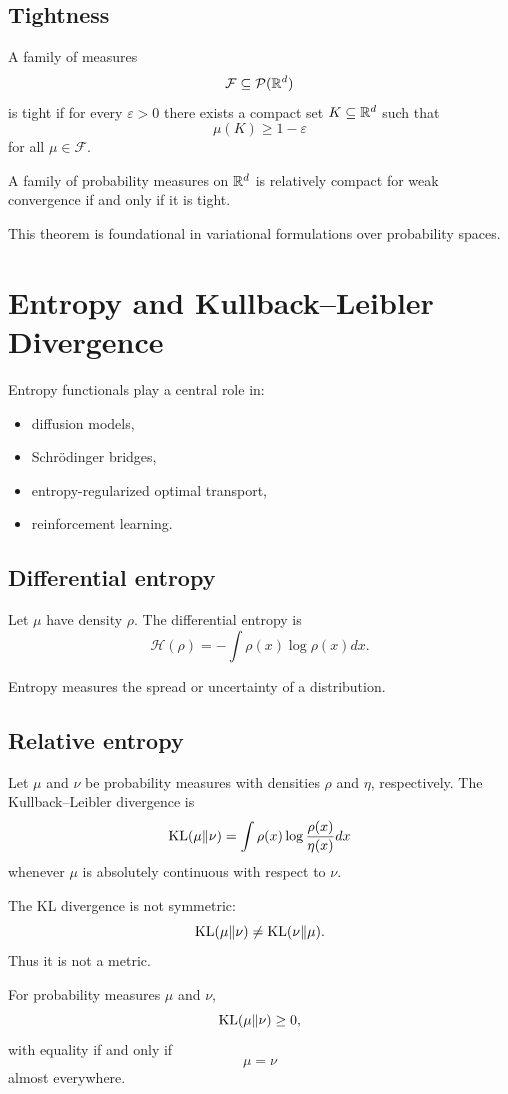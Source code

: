 \subsection{Tightness}
\begin{definition}
A family of measures
\[
\mathcal F \subseteq \mathcal{P}(\mathbb{R}^d)
\]
is tight if for every $\varepsilon>0$ there exists a compact set $K \subseteq \mathbb{R}^d$ such that
\[
\mu(K) \ge 1-\varepsilon
\]
for all $\mu \in \mathcal F$.
\end{definition}
\begin{theorem}[Prokhorov]
A family of probability measures on $\mathbb{R}^d$ is relatively compact for weak convergence if and only if it is tight.
\end{theorem}
This theorem is foundational in variational formulations over probability spaces.
\section{Entropy and Kullback--Leibler Divergence}
Entropy functionals play a central role in:
\begin{itemize}
    \item diffusion models,
    \item Schr\"odinger bridges,
    \item entropy-regularized optimal transport,
    \item reinforcement learning.
\end{itemize}
\subsection{Differential entropy}
\begin{definition}
Let $\mu$ have density $\rho$. The differential entropy is
\[
\mathcal H(\rho)
=
-\int \rho(x)\log \rho(x)dx.
\]
\end{definition}
Entropy measures the spread or uncertainty of a distribution.
\subsection{Relative entropy}
\begin{definition}
Let $\mu$ and $\nu$ be probability measures with densities $\rho$ and $\eta$, respectively. The Kullback--Leibler divergence is
\[
\mathrm{KL}(\mu\|\nu)
=
\int \rho(x)
\log \frac{\rho(x)}{\eta(x)}dx
\]
whenever $\mu$ is absolutely continuous with respect to $\nu$.
\end{definition}
\begin{remark}
The KL divergence is not symmetric:
\[
\mathrm{KL}(\mu\|\nu)
\neq
\mathrm{KL}(\nu\|\mu).
\]
Thus it is not a metric.
\end{remark}
\begin{theorem}
For probability measures $\mu$ and $\nu$,
\[
\mathrm{KL}(\mu\|\nu) \ge 0,
\]
with equality if and only if
\[
\mu=\nu
\]
almost everywhere.
\end{theorem}
